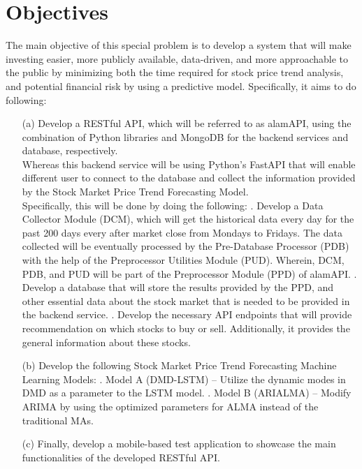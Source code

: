 \section{Objectives}
\label{sec:objectives}
The main objective of this special problem is to develop a 
system that will make investing easier, more publicly available, 
data-driven, and more approachable to the public by minimizing both the 
time required for stock price trend analysis, and potential financial risk 
by using a predictive model. Specifically, it aims to do following:
\begin{itemize}
  \item[(a)] Develop a RESTful API, which will be referred to as alamAPI, 
  using the combination of Python libraries and MongoDB for the backend 
  services and database, respectively.
  \vspace{0.5cm}
  \\Whereas this backend service will be using Python’s 
  FastAPI that will enable different user to connect to 
  the database and collect the information provided by the 
  Stock Market Price Trend Forecasting Model.
  \vspace{0.5cm}
  \\Specifically, this will be done by doing the following:
  .	Develop a Data Collector Module (DCM), 
  which will get the historical data every day for 
  the past 200 days every after market close from Mondays to Fridays. 
  The data collected will be eventually processed by the Pre-Database Processor 
  (PDB) with the help of the Preprocessor Utilities Module (PUD). 
  Wherein, DCM, PDB, and PUD will be part of the Preprocessor Module 
  (PPD) of alamAPI.
  .	Develop a database that will store the results provided by the PPD,
  and other essential data about the stock market that is needed to be provided
  in the backend service.
  .	Develop the necessary API endpoints 
  that will provide recommendation on which stocks to buy or sell. 
  Additionally, it provides the general information about these stocks.
  \item[(b)] Develop the following Stock Market Price Trend Forecasting 
  Machine Learning Models:
    .	Model A (DMD-LSTM) – Utilize the dynamic modes in DMD as a 
    parameter to the LSTM model.
    . Model B (ARIALMA) – Modify ARIMA by using 
    the optimized parameters for ALMA instead of the traditional MAs.
  \item[(c)] Finally, develop a mobile-based test application to showcase 
  the main functionalities of the developed RESTful API.
\end{itemize}